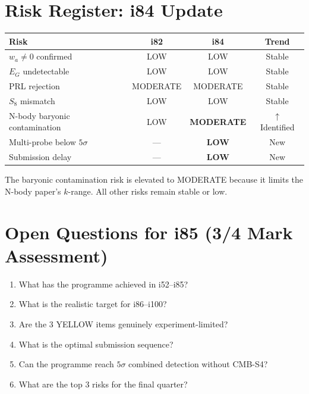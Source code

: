 \documentclass[11pt,a4paper]{article}
\begin{document}
\section{Risk Register: i84 Update}

\begin{center}
\begin{tabular}{lccc}
\toprule
\textbf{Risk} & \textbf{i82} & \textbf{i84} & \textbf{Trend} \\
\midrule
$w_a \neq 0$ confirmed & LOW & LOW & Stable \\
$E_G$ undetectable & LOW & LOW & Stable \\
PRL rejection & MODERATE & MODERATE & Stable \\
$S_8$ mismatch & LOW & LOW & Stable \\
N-body baryonic contamination & LOW & \textbf{MODERATE} & $\uparrow$ Identified \\
Multi-probe below $5\sigma$ & --- & \textbf{LOW} & New \\
Submission delay & --- & \textbf{LOW} & New \\
\bottomrule
\end{tabular}
\end{center}

The baryonic contamination risk is elevated to MODERATE because it limits the N-body paper's $k$-range. All other risks remain stable or low.

\section{Open Questions for i85 (3/4 Mark Assessment)}

\begin{enumerate}[nosep]
\item What has the programme achieved in i52--i85?
\item What is the realistic target for i86--i100?
\item Are the 3 YELLOW items genuinely experiment-limited?
\item What is the optimal submission sequence?
\item Can the programme reach $5\sigma$ combined detection without CMB-S4?
\item What are the top 3 risks for the final quarter?
\end{enumerate}
\end{document}
